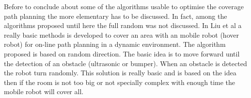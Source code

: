 		Before to conclude about some of the algorithms usable to optimise the coverage path planning the more elementary has to be discussed. In fact,  among the algorithms proposed until here the full random was not discussed. 
		In Liu et al \cite{242*liu2008} a really basic methods is developed to cover an area with an mobile robot (hover robot) for on-line path planning in a dynamic environment. The algorithm proposed is based on random direction. The basic idea is to move forward until the detection of an obstacle (ultrasonic or bumper). When an obstacle is detected the robot turn randomly. This solution is really basic and is based on the idea then if the room is not too big or not specially complex with enough time the mobile robot will cover all.
		
		


		


%
%	
%
%
%
%
%
%
%
%
